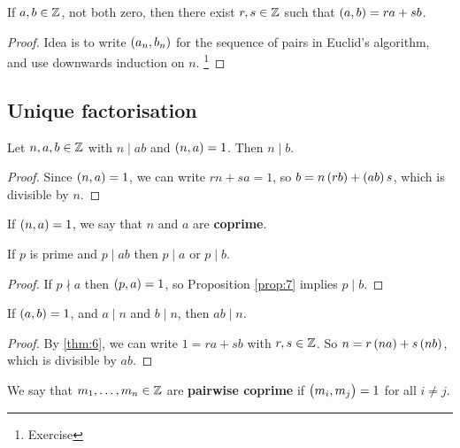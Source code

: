 \begin{theorem}
\label{thm:6}
If $ a, b \in \mathbb{Z} $, not both zero, then there exist $ r, s \in \mathbb{Z} $ such that $ \br{a, b} = ra + sb $.
\end{theorem}

\begin{proof}
Idea is to write $ \br{a_n, b_n} $ for the sequence of pairs in Euclid's algorithm, and use downwards induction on $ n $. \footnote{Exercise}
\end{proof}

\pagebreak

\subsection{Unique factorisation}

\begin{proposition}
\label{prop:7}
Let $ n, a, b \in \mathbb{Z} $ with $ n \mid ab $ and $ \br{n, a} = 1 $. Then $ n \mid b $.
\end{proposition}

\begin{proof}
Since $ \br{n, a} = 1 $, we can write $ rn + sa = 1 $, so $ b = n\br{rb} + \br{ab}s $, which is divisible by $ n $.
\end{proof}

If $ \br{n, a} = 1 $, we say that $ n $ and $ a $ are \textbf{coprime}.


\begin{corollary}
\label{cor:8}
If $ p $ is prime and $ p \mid ab $ then $ p \mid a $ or $ p \mid b $.
\end{corollary}

\begin{proof}
If $ p \nmid a $ then $ \br{p, a} = 1 $, so Proposition \ref{prop:7} implies $ p \mid b $.
\end{proof}

\begin{proposition}
\label{prop:9}
If $ \br{a, b} = 1 $, and $ a \mid n $ and $ b \mid n $, then $ ab \mid n $.
\end{proposition}

\begin{proof}
By \ref{thm:6}, we can write $ 1 = ra + sb $ with $ r, s \in \mathbb{Z} $. So $ n = r\br{na} + s\br{nb} $, which is divisible by $ ab $.
\end{proof}

We say that $ m_1, \dots, m_n \in \mathbb{Z} $ are \textbf{pairwise coprime} if $ \br{m_i, m_j} = 1 $ for all $ i \ne j $.

